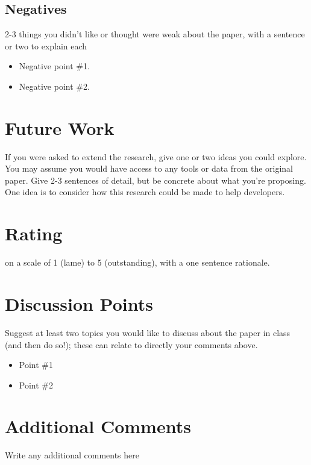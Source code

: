 \documentclass[sigconf, 10pt]{acmart}
\begin{document}
\subsection{Negatives}
2-3 things you didn't like or thought were weak about the paper, with a sentence or two to explain each
\begin{itemize}
    \item Negative point \#1.
    \item Negative point \#2.
\end{itemize}

\section{Future Work}
If you were asked to extend the research, give one or two ideas you could explore.  You may assume you would have access to any tools or data from the original paper.  Give 2-3 sentences of detail, but be concrete about what you're proposing.  One idea is to consider how this research could be made to help developers.

\section{Rating}
on a scale of 1 (lame) to 5 (outstanding), with a one sentence rationale.

\section{Discussion Points}
Suggest at least two topics you would like to discuss about the paper in class (and then do so!); these can relate to directly your comments above. 
\begin{itemize}
    \item Point \#1
    \item Point \#2
\end{itemize}

\section{Additional Comments}
Write any additional comments here
\end{document}
